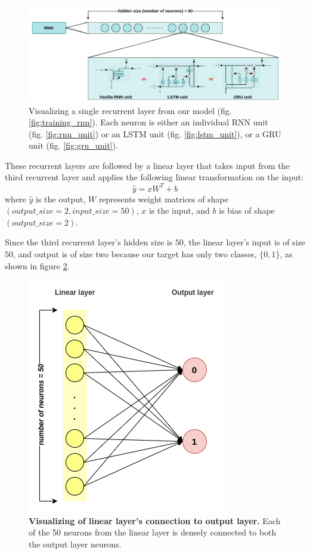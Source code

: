 \begin{figure}[h]
	\centering
	\includegraphics[width=1.0\linewidth]{images/experiments/recurrent_layer.png}
	\caption[Visualization of a single recurrent layer]%
	{Visualizing a single recurrent layer from our model (fig. \ref{fig:training_rnn}). Each neuron is either an individual RNN unit (fig. \ref{fig:rnn_unit}) or an LSTM unit (fig. \ref{fig:lstm_unit}), or a GRU unit (fig. \ref{fig:gru_unit}).}
	\label{fig:recurrent_layer}
\end{figure}

These recurrent layers are followed by a linear layer that takes input from the third recurrent layer and applies the following linear transformation on the input:
\begin{equation}
\label{eq:linear}
    \hat{y} = xW^{T}+b
\end{equation}
where $\hat{y}$ is the output, $W$ represents weight matrices of shape $(output\_size=2, input\_size=50)$, $x$ is the input, and $b$ is bias of shape $(output\_size=2)$.

Since the third recurrent layer's hidden size is $50$, the linear layer's input is of size $50$, and output is of size two because our target has only two classes, $\{0, 1\}$, as shown in figure \ref{fig:output_layer}.

\begin{figure}[h]
	\centering
	\includegraphics[width=0.3\linewidth]{images/experiments/output_layer.png}
	\caption[Visualization of linear layer's connection to output layer]%
	{\textbf{Visualizing of linear layer's connection to output layer.} Each of the 50 neurons from the linear layer is densely connected to both the output layer neurons.}
	\label{fig:output_layer}
\end{figure}

